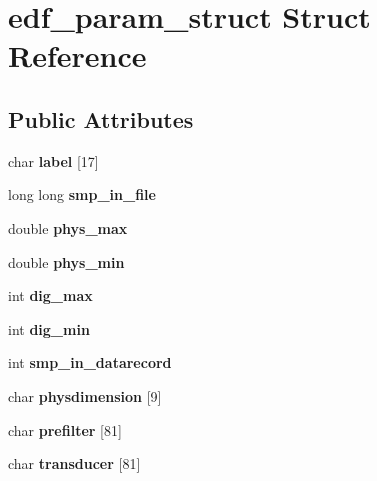 \hypertarget{structedf__param__struct}{}\section{edf\+\_\+param\+\_\+struct Struct Reference}
\label{structedf__param__struct}
\subsection*{Public Attributes}
\begin{DoxyCompactItemize}
\item 
\hypertarget{structedf__param__struct_a9994a125876130b4e32cdcbadf43467f}{}char {\bfseries label} \mbox{[}17\mbox{]}\label{structedf__param__struct_a9994a125876130b4e32cdcbadf43467f}

\item 
\hypertarget{structedf__param__struct_aca40a671ad161eac386867bd72aae6a5}{}long long {\bfseries smp\+\_\+in\+\_\+file}\label{structedf__param__struct_aca40a671ad161eac386867bd72aae6a5}

\item 
\hypertarget{structedf__param__struct_ac0f71659b06e202e8a5f434b2046f0e4}{}double {\bfseries phys\+\_\+max}\label{structedf__param__struct_ac0f71659b06e202e8a5f434b2046f0e4}

\item 
\hypertarget{structedf__param__struct_a3df5ae434b7b7f6c634058b467c7f6a0}{}double {\bfseries phys\+\_\+min}\label{structedf__param__struct_a3df5ae434b7b7f6c634058b467c7f6a0}

\item 
\hypertarget{structedf__param__struct_a85b01262adfb4453666d18dc7f526c9b}{}int {\bfseries dig\+\_\+max}\label{structedf__param__struct_a85b01262adfb4453666d18dc7f526c9b}

\item 
\hypertarget{structedf__param__struct_a4fe8e94411b899cb0d396aae20dabe2e}{}int {\bfseries dig\+\_\+min}\label{structedf__param__struct_a4fe8e94411b899cb0d396aae20dabe2e}

\item 
\hypertarget{structedf__param__struct_a2352446128ba09c7c1b1fde15f18cf5b}{}int {\bfseries smp\+\_\+in\+\_\+datarecord}\label{structedf__param__struct_a2352446128ba09c7c1b1fde15f18cf5b}

\item 
\hypertarget{structedf__param__struct_a3ed0d2438a725aed3dccde3011f48919}{}char {\bfseries physdimension} \mbox{[}9\mbox{]}\label{structedf__param__struct_a3ed0d2438a725aed3dccde3011f48919}

\item 
\hypertarget{structedf__param__struct_aa1dce299a0713a44f62cb36a471294fe}{}char {\bfseries prefilter} \mbox{[}81\mbox{]}\label{structedf__param__struct_aa1dce299a0713a44f62cb36a471294fe}

\item 
\hypertarget{structedf__param__struct_aa8ffc0013b8e08eba5d7ce10835b52d8}{}char {\bfseries transducer} \mbox{[}81\mbox{]}\label{structedf__param__struct_aa8ffc0013b8e08eba5d7ce10835b52d8}

\end{DoxyCompactItemize}


